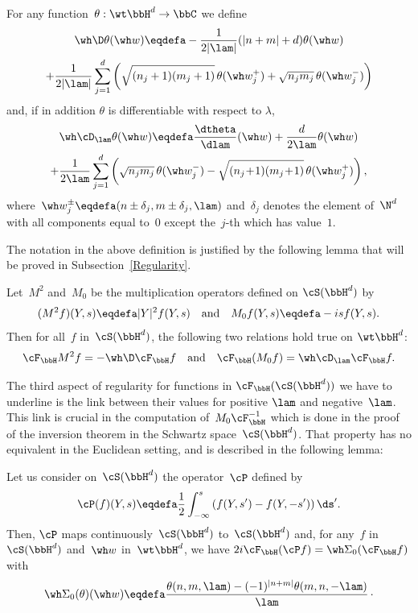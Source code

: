 \begin{defi}\label{definDeltaDlambda}
For any function~$\theta:\wt\bbH^d\to\bbC$ we define
\begin{multline}\label{decayWignerHermiteeq1}
\wh \D \theta(\wh w) \eqdefa - \frac 1{2|\lam|} (|n+m| +d) \theta(\wh w) \\
+\frac 1 {2|\lam|} \sum_{j=1} ^d \left (\sqrt {(n_j+1) (m_j+1)}\, \theta(\wh w_j^+) +\sqrt {n_jm_j}\, \theta(\wh w_j^-)\right)
\end{multline}
and, if in addition $\theta$ is differentiable with respect to $\lambda$,
\begin{multline}\label{eq:whDlambda}
\wh\cD_\lam \theta(\wh w) \eqdefa \frac {\dtheta} {\dlam} (\wh w)+ \frac d {2\lam} \theta(\wh w)
\\+\frac 1{2 \lam}\sum_{j=1}^d \left(
\sqrt {n_jm_{j} }\, \theta(\wh w_j^-)-\sqrt {(n_j\!+\!1)(m_j\!+\!1)} \, \theta(\wh w_j^+) \right),
\end{multline}
where~$\wh w_j^\pm\eqdefa(n\pm\delta_j,m\pm\delta_j,\lam)$ and~$\delta_j$ denotes the element of~$\N^d$ with all components equal to~$0$ except the~$j$-th which has value~$1$.
\end{defi}

The notation in the above definition is justified by the following lemma that will be proved in Subsection~\ref{Regularity}.

\begin{lemm}\label{decaygivesregul1}
Let~$M^2$ and~$M_0$ be the multiplication operators defined on $\cS(\bbH^d)$ by
\begin{equation}\label{weight}
(M^2f)(Y,s)\eqdefa|Y|^2f(Y,s)\quad\hbox{and}\quad M_0f(Y,s)\eqdefa-isf(Y,s).
\end{equation}
Then for all~$f$ in~$\cS(\bbH^d)$, the following two relations hold true on $\wt\bbH^d$:
\[
\cF_{\bbH} M^2 f= -\wh \D\cF_\bbH f\quad\hbox{and}\quad
\cF_\bbH(M_0 f) = \wh\cD_\lam \cF_\bbH f.
\]
\end{lemm}

The third aspect of regularity for functions in $\cF_\bbH(\cS(\bbH^d))$ we have to underline is the link between their values for positive $\lam$ and negative~$\lam$. This link is crucial in the computation of~$M_0 \cF^{-1}_\bbH$ which is done in the proof of the inversion theorem in the Schwartz space~$\cS(\bbH^d)$. That property has no equivalent in the Euclidean setting, and is described in the following lemma:

\begin{lemm}\label{symmetry0}
Let us consider on~$\cS(\bbH^d)$ the operator~$\cP$ defined by
\begin{equation}\label{eq:cP}
\cP(f) (Y,s) \eqdefa \frac 12 \int_{-\infty} ^s \left(f(Y,s') -f(Y,-s')\right) \ds'.
\end{equation}
Then, $ \cP$ maps continuously~$\cS(\bbH^d)$ to~$\cS(\bbH^d)$ and, for any~$f$ in~$\cS(\bbH^d)$ and~$\wh w$ in~$\wt\bbH^d$, we have $2i \cF_\bbH (\cP f) = \wh\Sigma_0 (\cF_\bbH f)$ with
\begin{equation}\label{eq:lam=0}
\wh\Sigma_0(\theta) (\wh w) \eqdefa \frac {\theta (n,m,\lam) -(-1) ^{|n+m|} \theta (m,n,-\lam)} \lam\,\cdotp
\end{equation}
\end{lemm}

